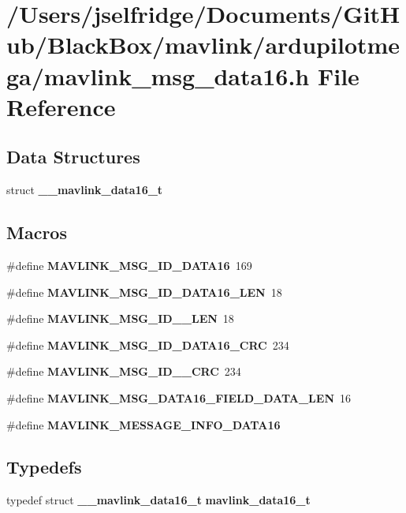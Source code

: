 \section{/\+Users/jselfridge/\+Documents/\+Git\+Hub/\+Black\+Box/mavlink/ardupilotmega/mavlink\+\_\+msg\+\_\+data16.h File Reference}
\label{mavlink__msg__data16_8h}
\subsection*{Data Structures}
\begin{DoxyCompactItemize}
\item 
struct \textbf{ \+\_\+\+\_\+mavlink\+\_\+data16\+\_\+t}
\end{DoxyCompactItemize}
\subsection*{Macros}
\begin{DoxyCompactItemize}
\item 
\#define \textbf{ M\+A\+V\+L\+I\+N\+K\+\_\+\+M\+S\+G\+\_\+\+I\+D\+\_\+\+D\+A\+T\+A16}~169
\item 
\#define \textbf{ M\+A\+V\+L\+I\+N\+K\+\_\+\+M\+S\+G\+\_\+\+I\+D\+\_\+\+D\+A\+T\+A16\+\_\+\+L\+EN}~18
\item 
\#define \textbf{ M\+A\+V\+L\+I\+N\+K\+\_\+\+M\+S\+G\+\_\+\+I\+D\+\_\+\_\+\+L\+EN}~18
\item 
\#define \textbf{ M\+A\+V\+L\+I\+N\+K\+\_\+\+M\+S\+G\+\_\+\+I\+D\+\_\+\+D\+A\+T\+A16\+\_\+\+C\+RC}~234
\item 
\#define \textbf{ M\+A\+V\+L\+I\+N\+K\+\_\+\+M\+S\+G\+\_\+\+I\+D\+\_\+\_\+\+C\+RC}~234
\item 
\#define \textbf{ M\+A\+V\+L\+I\+N\+K\+\_\+\+M\+S\+G\+\_\+\+D\+A\+T\+A16\+\_\+\+F\+I\+E\+L\+D\+\_\+\+D\+A\+T\+A\+\_\+\+L\+EN}~16
\item 
\#define \textbf{ M\+A\+V\+L\+I\+N\+K\+\_\+\+M\+E\+S\+S\+A\+G\+E\+\_\+\+I\+N\+F\+O\+\_\+\+D\+A\+T\+A16}
\end{DoxyCompactItemize}
\subsection*{Typedefs}
\begin{DoxyCompactItemize}
\item 
typedef struct \textbf{ \+\_\+\+\_\+mavlink\+\_\+data16\+\_\+t} \textbf{ mavlink\+\_\+data16\+\_\+t}
\end{DoxyCompactItemize}



